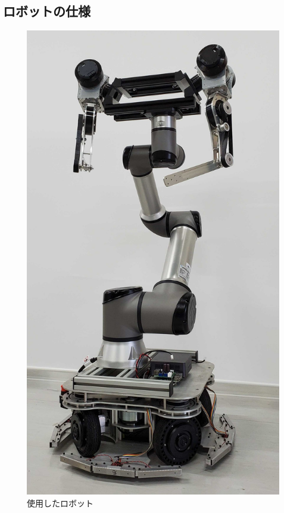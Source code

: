 \documentclass[9pt, twocolumn, a4paper]{jsarticle_kijou}
\begin{document}
\subsection{ロボットの仕様}
\begin{figure}[tbp]
  \centering
  \includegraphics[height=0.4\textheight]{fig/img_wholebody.jpg}
  \caption{使用したロボット}
  \label{figure:img_wholebody}
 \end{figure}
\end{document}
